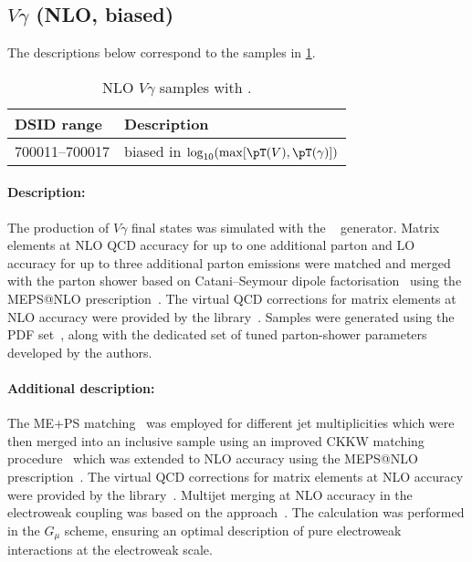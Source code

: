 


\subsection[Vgamma (NLO, biased)]{\(V\gamma\) (NLO, biased)}

The descriptions below correspond to the samples in
\cref{tab:MB-sherpa-vynlo-ew}.

\begin{table}[htbp]
  \caption{NLO \(V\gamma\) samples with \SHERPA.}%
  \label{tab:MB-sherpa-vynlo-ew}
  \centering
  \begin{tabular}{l l}
    \toprule
    DSID range & Description \\
    \midrule
    700011--700017 & biased in \(\log_{10}(\max[\pT(V), \pT(\gamma)])\)\\
    \bottomrule
  \end{tabular}
\end{table}

\paragraph{Description:}

The production of \(V\gamma\) final states was simulated with the
\SHERPA[2.2.8]~\cite{Bothmann:2019yzt} generator.  Matrix elements at
NLO QCD accuracy for up to one additional parton and LO accuracy for
up to three additional parton emissions were matched and merged with
the \SHERPA parton shower based on Catani--Seymour
dipole factorisation~\cite{Gleisberg:2008fv,Schumann:2007mg} using the MEPS@NLO
prescription~\cite{Hoeche:2011fd,Hoeche:2012yf,Catani:2001cc,Hoeche:2009rj}.
The virtual QCD corrections for matrix elements at NLO accuracy were provided by
the \OPENLOOPS[2] library~\cite{Buccioni:2019sur,Cascioli:2011va,Buccioni:2017yxi,Denner:2016kdg}.
Samples were generated using the \NNPDF[3.0nnlo] PDF set~\cite{Ball:2014uwa}, along with
the dedicated set of tuned parton-shower parameters developed by the \SHERPA authors.


\paragraph{Additional description:}

The ME+PS matching~\cite{Hoeche:2011fd} was employed for different jet
multiplicities which were then merged into an inclusive sample
using an improved CKKW matching
procedure~\cite{Catani:2001cc,Hoeche:2009rj} which was extended to NLO
accuracy using the MEPS@NLO prescription~\cite{Hoeche:2012yf}.
The virtual QCD corrections for matrix elements at NLO accuracy were provided by
the \OPENLOOPS[2] library~\cite{Buccioni:2019sur,Cascioli:2011va,Buccioni:2017yxi,Denner:2016kdg}.
Multijet merging at NLO accuracy in the electroweak coupling was based on
the \NLOEWvirt approach~\cite{Kallweit:2014xda,Kallweit:2015dum}.
The calculation was performed in the \(G_\mu\) scheme, ensuring an optimal
description of pure electroweak interactions at the electroweak scale.

